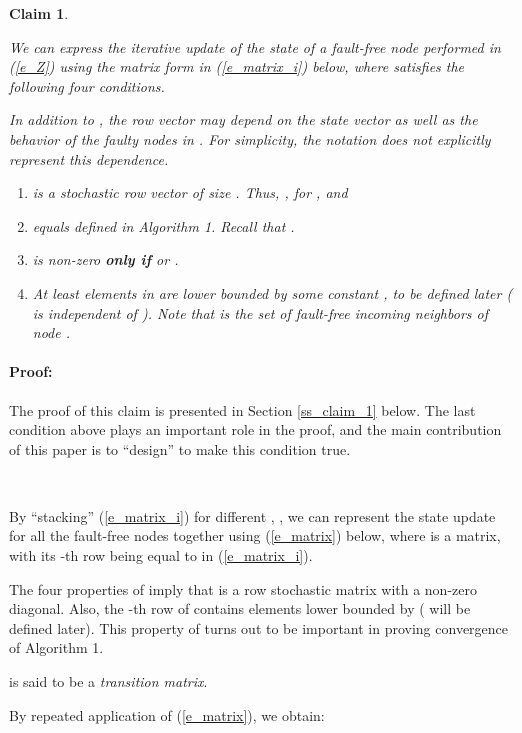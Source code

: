 \documentclass[letterpaper, 12pt]{article}
\newenvironment{proof}{\paragraph{\bf Proof:}}{\hspace*{\fill}}
\newtheorem{claim}{Claim}
\begin{document}
\begin{claim}
\label{claim_1}
{
We can express the iterative update of the state
of a fault-free node  
performed in (\ref{e_Z}) using the matrix form in (\ref{e_matrix_i})
below,
where  satisfies the following four conditions.

}
In addition to , the row vector  
may depend on the state vector  as well as the
behavior of the faulty
nodes in . For simplicity, the notation  does not
explicitly represent this dependence. 
\begin{enumerate}
\item  is a {\em stochastic} row vector of size .
Thus,
, for , and


\item  equals  defined in Algorithm 1. 
Recall that .

\item  is non-zero
{\bf only if}   or .
\item At least  elements in  
are lower bounded by some constant , to be defined later
( is independent of ). 
Note that  is the set of fault-free
incoming neighbors of node .
\end{enumerate}

\end{claim}
\begin{proof}
The proof of this claim is presented in Section \ref{ss_claim_1} below.
The last condition above plays an important role in the proof, and the
main contribution of this paper is to ``design''  to make this
condition true.
\end{proof}

~



By ``stacking'' (\ref{e_matrix_i}) for different
, , we can
represent the state update for all the fault-free nodes together
using (\ref{e_matrix})
below, where  is a  matrix, with its -th row
being equal to  in (\ref{e_matrix_i}).

The four properties of  imply that  is a
row stochastic matrix with a non-zero diagonal.
Also, the -th row of  contains 
elements lower bounded by  ( will be defined later).
This property of  turns out to be important in proving
convergence of Algorithm 1.

 is said to be a {\em transition matrix}.

By repeated application of (\ref{e_matrix}), we obtain:
\end{document}
